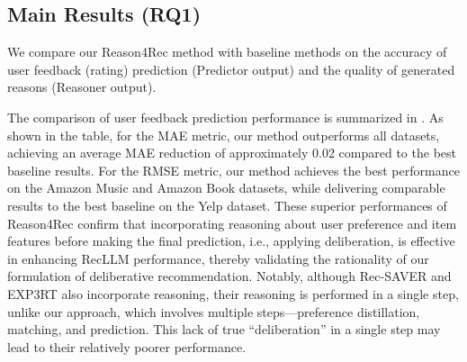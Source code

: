 \subsection{Main Results (RQ1)}
We compare our Reason4Rec method with baseline methods on the accuracy of user feedback (rating) prediction (Predictor output) and the quality of generated reasons (Reasoner output).





\vspace{+5pt}
The comparison of user feedback prediction performance is summarized in . As shown in the table, for the MAE metric, our method outperforms all datasets, achieving an average MAE reduction of approximately 0.02 compared to the best baseline results. For the RMSE metric, our method achieves the best performance on the Amazon Music and Amazon Book datasets, while delivering comparable results to the best baseline on the Yelp dataset. 
These superior performances of Reason4Rec confirm that incorporating reasoning about user preference and item features before making the final prediction, i.e., applying deliberation, is effective in enhancing RecLLM performance, thereby validating the rationality of our formulation of deliberative recommendation. 
Notably, although Rec-SAVER and EXP3RT also incorporate reasoning, their reasoning is performed in a single step, unlike our approach, which involves multiple steps—preference distillation, matching, and prediction. This lack of true ``deliberation'' in a single step may lead to their relatively poorer performance.  







